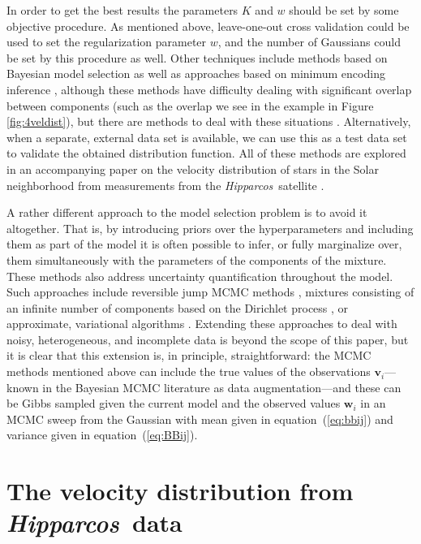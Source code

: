 \documentclass[aoas,preprint,authoryear,round]{imsart}
\newcommand{\eqnnumber}{equation}
\newcommand{\Hipparcos}{\emph{Hipparcos}}
\renewcommand{\vec}[1]{\mathbf{#1}} %
\newcommand{\vv}{\vec{v}}
\newcommand{\ww}{\vec{w}}
\newcommand{\vvi}{\vv_i}
\newcommand{\wwi}{\ww_i}
\begin{document}
In order to get the best results the parameters $K$ and $w$ should be
set by some objective procedure.  As mentioned above, leave-one-out
cross validation \citep{stone74a} could be used to set the
regularization parameter $w$, and the number of Gaussians could be set
by this procedure as well. Other techniques include methods based on
Bayesian model selection \citep{roberts98a} as well as approaches
based on minimum encoding inference
\citep{wallace68a,Oliver96a,rissanen78a,Schwartz78a}, although these
methods have difficulty dealing with significant overlap between
components (such as the overlap we see in the example in Figure
\ref{fig:4veldist}), but there are methods to deal with these
situations \citep{baxter95a}. Alternatively, when a separate, external
data set is available, we can use this as a test data set to validate
the obtained distribution function.  All of these methods are explored
in an accompanying paper on the velocity distribution of stars in the
Solar neighborhood from measurements from the \Hipparcos\ satellite
\citep[see below;][]{Bovy09b}.

A rather different approach to the model selection problem is to avoid
it altogether. That is, by introducing priors over the hyperparameters
and including them as part of the model it is often possible to infer,
or fully marginalize over, them simultaneously with the parameters of
the components of the mixture. These methods also address uncertainty
quantification throughout the model. Such approaches include
reversible jump MCMC methods \citep{Richardson97a}, mixtures
consisting of an infinite number of components based on the Dirichlet
process \citep{rasmussen00infinite}, or approximate, variational
algorithms \citep{Ghahramani00variationalinference,Beal03}. Extending
these approaches to deal with noisy, heterogeneous, and incomplete
data is beyond the scope of this paper, but it is clear that this
extension is, in principle, straightforward: the MCMC methods
mentioned above can include the true values of the observations
$\vvi$---known in the Bayesian MCMC literature as data
augmentation---and these can be Gibbs sampled given the current model
and the observed values $\wwi$ in an MCMC sweep from the Gaussian with
mean given in \eqnnumber~(\ref{eq:bbij}) and variance given in
\eqnnumber~(\ref{eq:BBij}).



\section{The velocity distribution from \Hipparcos\ data}\label{sec:hipparcos}
\end{document}
